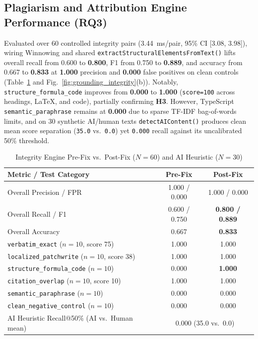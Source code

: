 \documentclass[conference]{IEEEtran}
\begin{document}
\subsection{Plagiarism and Attribution Engine Performance (RQ3)}
Evaluated over 60 controlled integrity pairs (3.44~ms/pair, 95\% CI [3.08, 3.98]), wiring Winnowing and shared \texttt{extractStructuralElementsFromText()} lifts overall recall from 0.600 to \textbf{0.800}, F1 from 0.750 to \textbf{0.889}, and accuracy from 0.667 to \textbf{0.833} at \textbf{1.000} precision and \textbf{0.000} false positives on clean controls (Table~\ref{tab:integrity} and Fig.~\ref{fig:grounding_integrity}(b)). Notably, \texttt{structure\_formula\_code} improves from \textbf{0.000} to \textbf{1.000} (\texttt{score=100} across headings, LaTeX, and code), partially confirming \textbf{H3}. However, TypeScript \texttt{semantic\_paraphrase} remains at \textbf{0.000} due to sparse TF-IDF bag-of-words limits, and on 30 synthetic AI/human texts \texttt{detectAIContent()} produces clean mean score separation (\texttt{35.0} vs.\ \texttt{0.0}) yet \texttt{0.000} recall against its uncalibrated 50\% threshold.

\begin{table}[t]
\centering
\caption{Integrity Engine Pre-Fix vs.\ Post-Fix ($N{=}60$) and AI Heuristic ($N{=}30$)}
\label{tab:integrity}
\footnotesize
\setlength{\tabcolsep}{4pt}
\begin{tabular}{p{4.3cm}cc}
\toprule
\textbf{Metric / Test Category} & \textbf{Pre-Fix} & \textbf{Post-Fix} \\
\midrule
Overall Precision / FPR & 1.000 / 0.000 & 1.000 / 0.000 \\
Overall Recall / F1 & 0.600 / 0.750 & \textbf{0.800 / 0.889} \\
Overall Accuracy & 0.667 & \textbf{0.833} \\
\midrule
\texttt{verbatim\_exact} ($n{=}10$, score 75) & 1.000 & 1.000 \\
\texttt{localized\_patchwrite} ($n{=}10$, score 38) & 1.000 & 1.000 \\
\texttt{structure\_formula\_code} ($n{=}10$) & 0.000 & \textbf{1.000} \\
\texttt{citation\_overlap} ($n{=}10$, score 10) & 1.000 & 1.000 \\
\texttt{semantic\_paraphrase} ($n{=}10$) & 0.000 & 0.000 \\
\texttt{clean\_negative\_control} ($n{=}10$) & 0.000 & 0.000 \\
\midrule
AI Heuristic Recall@50\% (AI vs.\ Human mean) & \multicolumn{2}{c}{0.000 (35.0 vs.\ 0.0)} \\
\bottomrule
\end{tabular}
\end{table}
\end{document}
